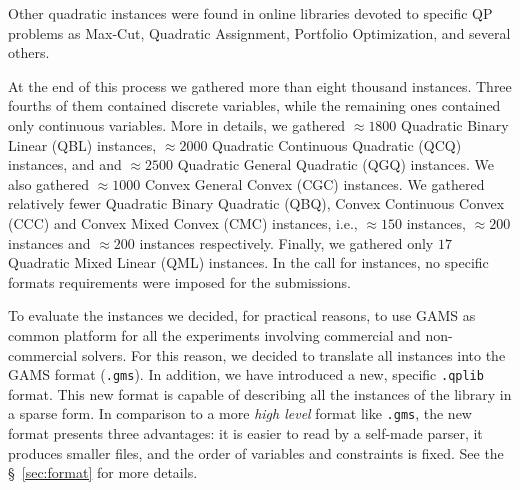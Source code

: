 Other quadratic instances were found in online libraries devoted to
specific QP problems as Max-Cut, Quadratic Assignment, Portfolio
Optimization, and several others.

At the end of this process we gathered more than eight thousand
instances. Three fourths of them contained discrete variables, while
the remaining ones contained only continuous variables. More in details,
we gathered $\approx 1800$ Quadratic Binary Linear (QBL) instances,
$\approx 2000$ Quadratic Continuous Quadratic (QCQ) instances, and
and $\approx 2500$ Quadratic General Quadratic (QGQ) instances. We
also gathered $\approx 1000$ Convex General Convex (CGC) instances. We
gathered relatively fewer Quadratic Binary Quadratic (QBQ), Convex
Continuous Convex (CCC) and Convex Mixed Convex (CMC) instances, i.e.,
$\approx 150$ instances, $\approx 200$ instances and $\approx 200$
instances respectively. Finally, we gathered only $17$ Quadratic Mixed
Linear (QML) instances. In the call for instances, no specific formats
requirements were imposed for the submissions.

To evaluate the instances we decided, for practical reasons, to use
GAMS as common platform for all the experiments involving commercial and
non-commercial solvers. For this reason, we decided to translate all
instances into the GAMS format (\texttt{.gms}). 
%
In addition, we have introduced a new, specific \texttt{.qplib} format. This
new format is capable of describing all the instances of the library in a sparse form.
In comparison to a more \emph{high level} format like \texttt{.gms}, the new
format presents three advantages: it is easier to read by a self-made parser, it produces smaller files, and the order of variables and constraints is fixed. See the \S~\ref{sec:format} for more details.


